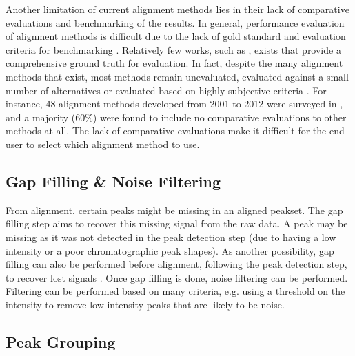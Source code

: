 Another limitation of current alignment methods lies in their lack of comparative evaluations and benchmarking of the results. In general, performance evaluation of alignment methods is difficult due to the lack of gold standard and evaluation criteria for benchmarking \cite{Castillo2011,Smith2013a}. Relatively few works, such as \cite{Lange2008}, exists that provide a comprehensive ground truth for evaluation. In fact, despite the many alignment methods that exist, most methods remain unevaluated, evaluated against a small number of alternatives or evaluated based on highly subjective criteria \cite{Smith2013}. For instance, 48 alignment methods developed from 2001 to 2012 were surveyed in \cite{Smith2013a}, and a majority (60\%) were found to include no comparative evaluations to other methods at all. The lack of comparative evaluations make it difficult for the end-user to select which alignment method to use.


\subsection{Gap Filling \& Noise Filtering}

From alignment, certain peaks might be missing in an aligned peakset. The gap filling step aims to recover this missing signal from the raw data. A peak may be missing as it was not detected in the peak detection step (due to having a low intensity or a poor chromatographic peak shapes). As another possibility, gap filling can also be performed before alignment, following the peak detection step, to recover lost signals \cite{benton2010correction}. Once gap filling is done, noise filtering can be performed. Filtering can be performed based on many criteria, e.g. using a threshold on the intensity to remove low-intensity peaks that are likely to be noise.

\subsection{Peak Grouping\label{sub:grouping-background}}

